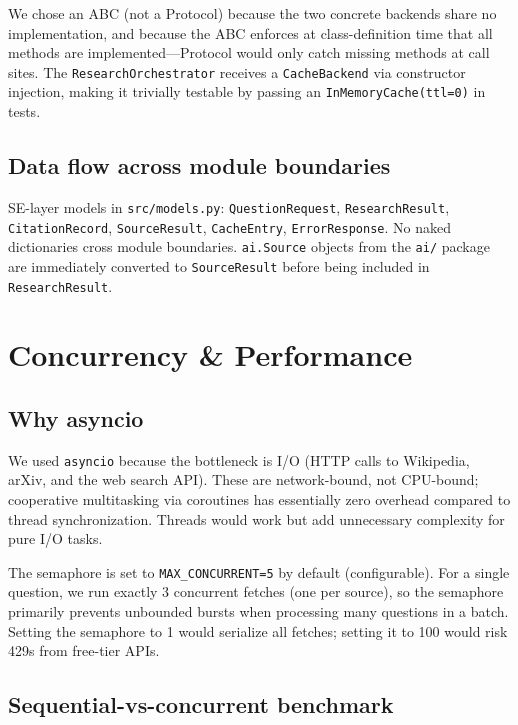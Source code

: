 \documentclass[11pt,a4paper]{article}
\begin{document}
We chose an ABC (not a Protocol) because the two concrete backends share no implementation, and because the ABC enforces at class-definition time that all methods are implemented—Protocol would only catch missing methods at call sites. The \texttt{ResearchOrchestrator} receives a \texttt{CacheBackend} via constructor injection, making it trivially testable by passing an \texttt{InMemoryCache(ttl=0)} in tests.

\subsection{Data flow across module boundaries}

SE-layer models in \texttt{src/models.py}: \texttt{QuestionRequest}, \texttt{ResearchResult}, \texttt{CitationRecord}, \texttt{SourceResult}, \texttt{CacheEntry}, \texttt{ErrorResponse}. No naked dictionaries cross module boundaries. \texttt{ai.Source} objects from the \texttt{ai/} package are immediately converted to \texttt{SourceResult} before being included in \texttt{ResearchResult}.

\section{Concurrency \& Performance}\label{sec:concurrency}

\subsection{Why asyncio}

We used \texttt{asyncio} because the bottleneck is I/O (HTTP calls to Wikipedia, arXiv, and the web search API). These are network-bound, not CPU-bound; cooperative multitasking via coroutines has essentially zero overhead compared to thread synchronization. Threads would work but add unnecessary complexity for pure I/O tasks.

The semaphore is set to \texttt{MAX\_CONCURRENT=5} by default (configurable). For a single question, we run exactly 3 concurrent fetches (one per source), so the semaphore primarily prevents unbounded bursts when processing many questions in a batch. Setting the semaphore to 1 would serialize all fetches; setting it to 100 would risk 429s from free-tier APIs.

\subsection{Sequential-vs-concurrent benchmark}
\end{document}
